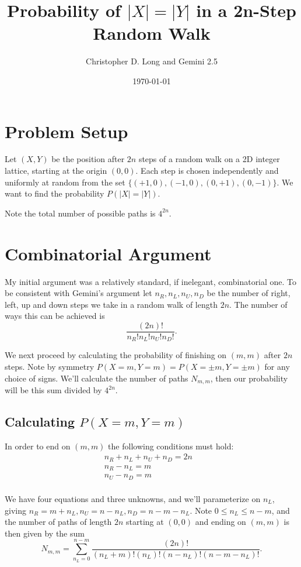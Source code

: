 \documentclass{article}
\title{Probability of $|X|=|Y|$ in a 2n-Step Random Walk}
\author{Christopher D. Long and Gemini 2.5} %
\date{\today} %
\begin{document}
\maketitle %

\section{Problem Setup}

Let $(X, Y)$ be the position after $2n$ steps of a random walk on a 2D integer lattice, starting at the origin $(0,0)$. Each step is chosen independently and uniformly at random from the set $\{(+1, 0), (-1, 0), (0, +1), (0, -1)\}$. We want to find the probability $P(|X|=|Y|)$.

Note the total number of possible paths is $4^{2n}$.

\section{Combinatorial Argument}

My initial argument was a relatively standard, if inelegant, combinatorial one. To be consistent with Gemini's argument let $n_R, n_L, n_U, n_D$ be the number of right, left, up and down steps we take in a random walk of length $2n$. The number of ways this can be achieved is $$\frac{(2n)!}{n_R! n_L! n_U! n_D!}.$$

We next proceed by calculating the probability of finishing on $(m,m)$ after $2n$ steps. Note by symmetry $P(X=m,Y=m) = P(X=\pm m,Y= \pm m)$ for any choice of signs. We'll calculate the number of paths $N_{m,m}$, then our probability will be this sum divided by $4^{2n}$.

\subsection{Calculating $P(X=m,Y=m)$}

In order to end on $(m,m)$ the following conditions must hold:
\begin{align*}
  n_R+n_L+n_U+n_D = 2n & \\
  n_R-n_L = m & \\
  n_U-n_D = m & \\
\end{align*}

We have four equations and three unknowns, and we'll parameterize on $n_L$, giving $n_R = m+n_L, n_U = n-n_L, n_D = n-m-n_L$. Note $0 \leq n_L \leq n-m$, and the number of paths of length $2n$ starting at $(0,0)$ and ending on $(m,m)$ is then given by the sum $$N_{m,m} = \sum_{n_L=0}^{n-m} \frac{(2n)!}{(n_L+m)!(n_L)!(n-n_L)!(n-m-n_L)!}.$$
\end{document}
